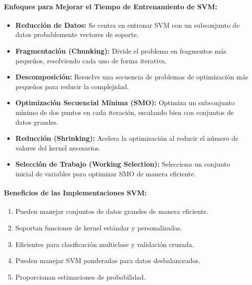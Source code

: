 \paragraph*{Enfoques para Mejorar el Tiempo de Entrenamiento de SVM:}
\begin{itemize}
	\item \textbf{Reducción de Datos:} Se centra en entrenar SVM con un subconjunto de datos probablemente vectores de soporte.
	\item \textbf{Fragmentación (Chunking):} Divide el problema en fragmentos más pequeños, resolviendo cada uno de forma iterativa.
	\item \textbf{Descomposición:} Resuelve una secuencia de problemas de optimización más pequeños para reducir la complejidad.
	\item \textbf{Optimización Secuencial Mínima (SMO):} Optimiza un subconjunto mínimo de dos puntos en cada iteración, escalando bien con conjuntos de datos grandes.
	\item \textbf{Reducción (Shrinking):} Acelera la optimización al reducir el número de valores del kernel necesarios.
	\item \textbf{Selección de Trabajo (Working Selection):} Selecciona un conjunto inicial de variables para optimizar SMO de manera eficiente.
\end{itemize}

\paragraph*{Beneficios de las Implementaciones SVM:}
\begin{enumerate}
	\item Pueden manejar conjuntos de datos grandes de manera eficiente.
	\item Soportan funciones de kernel estándar y personalizadas.
	\item Eficientes para clasificación multiclase y validación cruzada.
	\item Pueden manejar SVM ponderadas para datos desbalanceados.
	\item Proporcionan estimaciones de probabilidad.
\end{enumerate}

